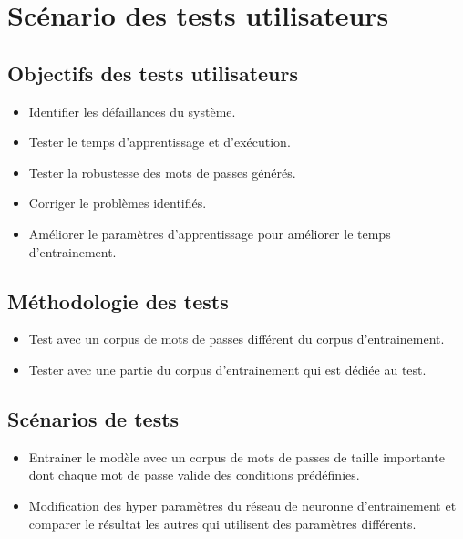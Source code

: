 \section{Scénario des tests utilisateurs}
\subsection{Objectifs des tests utilisateurs}
\begin{itemize}
    \item Identifier les défaillances du système.
    \item Tester le temps d'apprentissage et d'exécution.
    \item Tester la robustesse des mots de passes générés.
    \item Corriger le problèmes identifiés.
    \item Améliorer le paramètres d'apprentissage pour améliorer le temps d'entrainement.
\end{itemize}
\subsection{Méthodologie des tests}
\begin{itemize}
    \item Test avec un corpus de mots de passes différent du corpus d'entrainement.
    \item Tester avec une partie du corpus d'entrainement qui est dédiée au test.
\end{itemize}
\subsection{Scénarios de tests}
\begin{itemize}
    \item Entrainer le modèle avec un corpus de mots de passes de taille importante dont chaque mot de passe valide des conditions prédéfinies.
    \item Modification des hyper paramètres du réseau de neuronne d'entrainement et comparer le résultat les autres qui utilisent des paramètres différents.
\end{itemize}